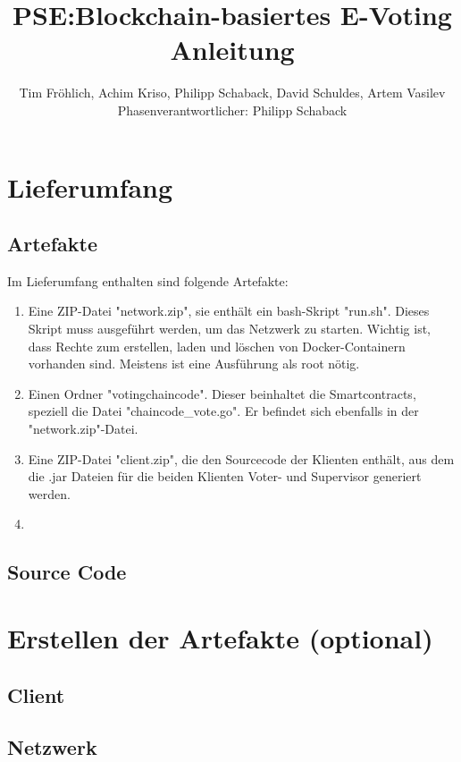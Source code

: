 \documentclass[parskip=full]{scrartcl}
\title{
	PSE:Blockchain-basiertes E-Voting \\
	Anleitung
}
\author{Tim Fröhlich, Achim Kriso, Philipp Schaback, David Schuldes, Artem Vasilev\\ Phasenverantwortlicher: Philipp Schaback}
\begin{document}
	\clearpage
	\maketitle
	\newpage
	
	\tableofcontents
	\newpage
	
	\section{Lieferumfang}
	\subsection{Artefakte}
	Im Lieferumfang enthalten sind folgende Artefakte:
	\begin{enumerate}
		\item Eine ZIP-Datei "network.zip", sie enthält ein bash-Skript "run.sh". Dieses Skript muss ausgeführt werden, um das Netzwerk zu starten. Wichtig ist, dass Rechte zum erstellen, laden und löschen von Docker-Containern vorhanden sind. Meistens ist eine Ausführung als root nötig.
		\item Einen Ordner "votingchaincode". Dieser beinhaltet die Smartcontracts, speziell die Datei "chaincode_vote.go". Er befindet sich ebenfalls in der "network.zip"-Datei.
		\item Eine ZIP-Datei "client.zip", die den Sourcecode der Klienten enthält, aus dem die .jar Dateien für die beiden Klienten Voter- und Supervisor generiert werden.
		\item 
	\end{enumerate}

	\subsection{Source Code}
	
	
	\section{Erstellen der Artefakte (optional)}
	\subsection{Client}
	
	\subsection{Netzwerk}
	
\end{document}

